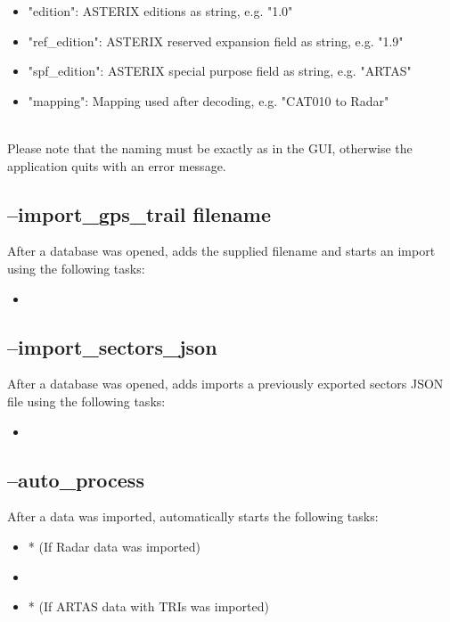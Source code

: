 \begin{itemize}
\item "edition":  ASTERIX editions as string, e.g. "1.0"
\item "ref\_edition":  ASTERIX reserved expansion field as string, e.g. "1.9"
\item "spf\_edition": ASTERIX special purpose field as string, e.g. "ARTAS"
\item "mapping": Mapping used after decoding, e.g. "CAT010 to Radar"
\end{itemize}
\ \\

Please note that the naming must be exactly as in the GUI, otherwise the application quits with an error message.


\subsection{--import\_gps\_trail filename}

After a database was opened, adds the supplied filename and starts an import using the following tasks:

\begin{itemize}
 \item {}
\end{itemize}

\subsection{--import\_sectors\_json}

After a database was opened, adds imports a previously exported sectors JSON file using the following tasks:

\begin{itemize}
 \item {}
\end{itemize}


\subsection{--auto\_process}

After a data was imported, automatically starts the following tasks:

\begin{itemize}
 \item {}* (If Radar data was imported)
 \item {}
 \item {}* (If ARTAS data with TRIs was imported)
\end{itemize}

